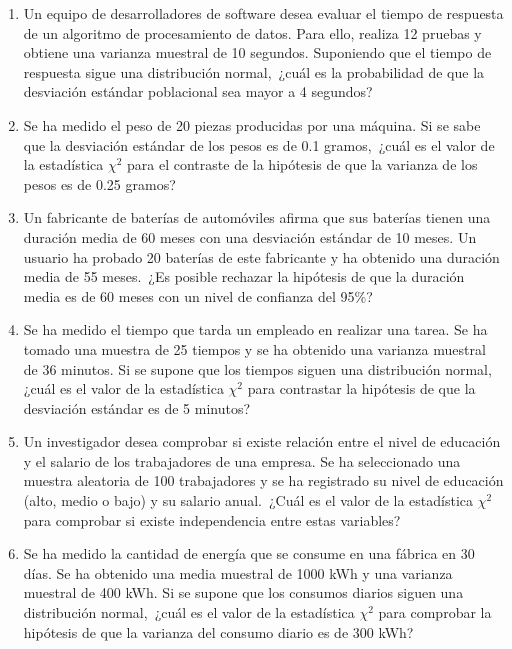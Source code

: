 \begin{Ejer}
\begin{enumerate}
\item Un equipo de desarrolladores de software desea evaluar el tiempo de respuesta de un algoritmo de procesamiento de datos. Para ello, realiza 12 pruebas y obtiene una varianza muestral de 10 segundos. Suponiendo que el tiempo de respuesta sigue una distribuci\'on normal, \,¿cu\'al es la probabilidad de que la desviaci\'on est\'andar poblacional sea mayor a 4 segundos?

\item Se ha medido el peso de 20 piezas producidas por una m\'aquina. Si se sabe que la desviaci\'on est\'andar de los pesos es de 0.1 gramos, \,¿cu\'al es el valor de la estad\'istica $\chi^2$ para el contraste de la hip\'otesis de que la varianza de los pesos es de 0.25 gramos?

\item Un fabricante de bater\'ias de autom\'oviles afirma que sus bater\'ias tienen una duraci\'on media de 60 meses con una desviaci\'on est\'andar de 10 meses. Un usuario ha probado 20 bater\'ias de este fabricante y ha obtenido una duraci\'on media de 55 meses. \,¿Es posible rechazar la hip\'otesis de que la duraci\'on media es de 60 meses con un nivel de confianza del 95\%?

\item Se ha medido el tiempo que tarda un empleado en realizar una tarea. Se ha tomado una muestra de 25 tiempos y se ha obtenido una varianza muestral de 36 minutos. Si se supone que los tiempos siguen una distribuci\'on normal, \,¿cu\'al es el valor de la estad\'istica $\chi^2$ para contrastar la hip\'otesis de que la desviaci\'on est\'andar es de 5 minutos?

\item Un investigador desea comprobar si existe relaci\'on entre el nivel de educaci\'on y el salario de los trabajadores de una empresa. Se ha seleccionado una muestra aleatoria de 100 trabajadores y se ha registrado su nivel de educaci\'on (alto, medio o bajo) y su salario anual. \,¿Cu\'al es el valor de la estad\'istica $\chi^2$ para comprobar si existe independencia entre estas variables?

\item Se ha medido la cantidad de energ\'ia que se consume en una f\'abrica en 30 d\'ias. Se ha obtenido una media muestral de 1000 kWh y una varianza muestral de 400 kWh. Si se supone que los consumos diarios siguen una distribuci\'on normal, \,¿cu\'al es el valor de la estad\'istica $\chi^2$ para comprobar la hip\'otesis de que la varianza del consumo diario es de 300 kWh?


\end{enumerate}
\end{Ejer}
